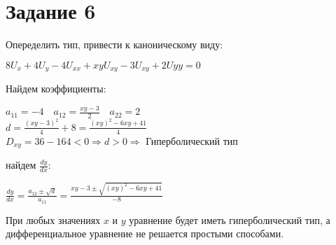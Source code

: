 \documentclass{article}
\begin{document}
	\newpage

	\section{\Large{Задание 6}}
	Опеределить тип, привести к каноническому виду:\\
	\begin{center}
		$ 8U_x + 4U_y - 4 U_{xx} + xyU_{xy} - 3U_{xy} + 2U{yy} = 0 $
	\end{center}
	Найдем коэффициенты: \\
	\begin{center}
		$ a_{11} = -4 \quad a_{12} = \frac{xy - 3}{2} \quad a_{22} = 2 $ \\
		$ d=\frac{(xy-3)^2}{4} + 8 = \frac{(xy)^2 - 6xy + 41}{4} $ \\ 
		$ D_{xy} = 36 - 164 < 0 \Rightarrow d > 0 \Rightarrow $ Гиперболический тип \\
	\end{center}
	найдем $ \frac{dy}{dx} $:
	\begin{center}
		$ \frac{dy}{dx} = \frac{a_{12} \pm \sqrt{d}}{a_{11}} = \frac{xy - 3 \pm \sqrt{(xy)^2 - 6xy + 41}}{-8} $ \\ 
	\end{center} 
	При любых значениях $ x $ и $ y $ уравнение будет иметь гиперболический тип, а дифференциальное уравнение не решается простыми способами.
\end{document}
